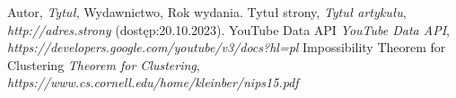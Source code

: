\begin{thebibliography}{9}
\small
{}
Autor, \emph{Tytuł}, Wydawnictwo, Rok wydania.
Tytuł strony, \emph{Tytuł artykułu}, \emph{http://adres.strony} (dostęp:20.10.2023).
YouTube Data API \emph{YouTube Data API}, \emph{https://developers.google.com/youtube/v3/docs?hl=pl}
Impossibility Theorem for Clustering \emph{Theorem for Clustering}, \emph{https://www.cs.cornell.edu/home/kleinber/nips15.pdf}
\end{thebibliography}
